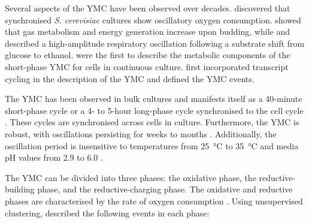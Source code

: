 Several aspects of the YMC have been observed over decades.
\citet{nosohSYNCHRONIZATIONBUDDINGCYCLE1962} discovered that synchronised \emph{S. cerevisiae} cultures show oscillatory oxygen consumption.
\citet{kasparvonmeyenburgEnergeticsBuddingCycle1969} showed that gas metabolism and energy generation increase upon budding, while and \citet{mochanRespiratoryOscillationsAdapting1973} described a high-amplitude respiratory oscillation following a substrate shift from glucose to ethanol.
\citet{satroutdinovOscillatoryMetabolismSaccharomyces1992} were the first to describe the metabolic components of the short-phase YMC for cells in continuous culture.
\citet{tuLogicYeastMetabolic2005} first incorporated transcript cycling in the description of the YMC and defined the YMC events.

The YMC has been observed in bulk cultures and manifests itself as a
40-minute short-phase cycle or
a 4- to 5-hour long-phase cycle synchronised to the cell cycle \citep{mellorMolecularBasisMetabolic2016}.
These cycles are synchronised across cells in culture.
Furthermore, the YMC is robust, with oscillations persisting for weeks to months \citep{lloydRedoxRhythmicityClocks2007}.
Additionally, the oscillation period is insensitive to temperatures from \SI{25}{\celsius} to \SI{35}{\celsius} and media pH values from
2.9 to 6.0 \citep{lloydUltradianMetronomeTimekeeper2005}.


The YMC can be divided into three phases: the oxidative phase, the reductive-building phase, and the
reductive-charging phase.
The oxidative and reductive phases are characterised by the rate of oxygen consumption \citep{mellorMolecularBasisMetabolic2016}.
Using unsupervised clustering, \citet{tuLogicYeastMetabolic2005} described the following events in each phase:


